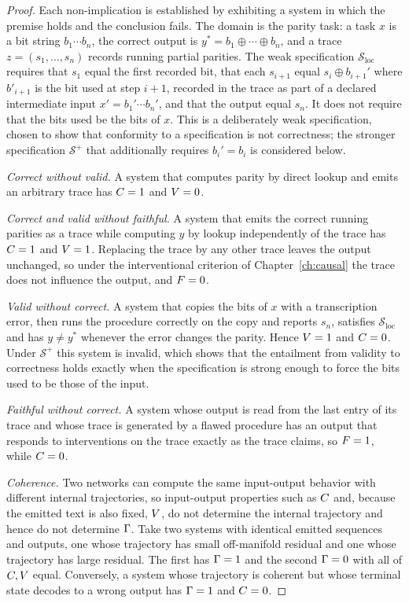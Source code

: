 \begin{proof}
Each non-implication is established by exhibiting a system in which the premise holds and the conclusion fails. The domain is the parity task: a task $x$ is a bit string $b_1\cdots b_n$, the correct output is $y^\ast=b_1\oplus\cdots\oplus b_n$, and a trace $z=(s_1,\dots,s_n)$ records running partial parities. The weak specification $\mathcal S_{\mathrm{loc}}$ requires that $s_1$ equal the first recorded bit, that each $s_{i+1}$ equal $s_i\oplus b_{i+1}'$ where $b'_{i+1}$ is the bit used at step $i+1$, recorded in the trace as part of a declared intermediate input $x'=b_1'\cdots b_n'$, and that the output equal $s_n$. It does not require that the bits used be the bits of $x$. This is a deliberately weak specification, chosen to show that conformity to a specification is not correctness; the stronger specification $\mathcal S^+$ that additionally requires $b_i'=b_i$ is considered below.

\emph{Correct without valid.} A system that computes parity by direct lookup and emits an arbitrary trace has $C=1$ and $V=0$.

\emph{Correct and valid without faithful.} A system that emits the correct running parities as a trace while computing $y$ by lookup independently of the trace has $C=1$ and $V=1$. Replacing the trace by any other trace leaves the output unchanged, so under the interventional criterion of Chapter~\ref{ch:causal} the trace does not influence the output, and $F=0$.

\emph{Valid without correct.} A system that copies the bits of $x$ with a transcription error, then runs the procedure correctly on the copy and reports $s_n$, satisfies $\mathcal S_{\mathrm{loc}}$ and has $y\neq y^\ast$ whenever the error changes the parity. Hence $V=1$ and $C=0$. Under $\mathcal S^+$ this system is invalid, which shows that the entailment from validity to correctness holds exactly when the specification is strong enough to force the bits used to be those of the input.

\emph{Faithful without correct.} A system whose output is read from the last entry of its trace and whose trace is generated by a flawed procedure has an output that responds to interventions on the trace exactly as the trace claims, so $F=1$, while $C=0$.

\emph{Coherence.} Two networks can compute the same input-output behavior with different internal trajectories, so input-output properties such as $C$ and, because the emitted text is also fixed, $V$, do not determine the internal trajectory and hence do not determine $\Gamma$. Take two systems with identical emitted sequences and outputs, one whose trajectory has small off-manifold residual and one whose trajectory has large residual. The first has $\Gamma=1$ and the second $\Gamma=0$ with all of $C,V$ equal. Conversely, a system whose trajectory is coherent but whose terminal state decodes to a wrong output has $\Gamma=1$ and $C=0$.


\end{proof}
